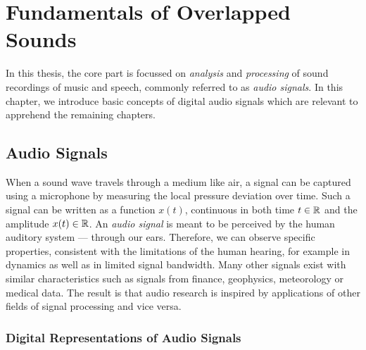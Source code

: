 \hypertarget{Fundamentals of Overlapped Sounds}{%
\chapter{Fundamentals of Overlapped Sounds}\label{cha:fundamentals}}

In this thesis, the core part is focussed on \emph{analysis} and \emph{processing} of sound recordings of music and speech, commonly referred to as \emph{audio signals}.
In this chapter, we introduce basic concepts of digital audio signals which are relevant to apprehend the remaining chapters.

\hypertarget{Audio Signals}{%
\section{Audio Signals}\label{sec:specifics-of-audio-signals}}

When a sound wave travels through a medium like air, a signal can be captured using a microphone by measuring the local pressure deviation over time.
Such a signal can be written as a function \(x(t)\), continuous in both time \(t \in {\mathbb{R}}\) and the amplitude \(x(t) \in {\mathbb{R}}\).
An \emph{audio signal} is meant to be perceived by the human auditory system --- through our ears.
Therefore, we can observe specific properties, consistent with the limitations of the human hearing, for example in dynamics as well as in limited signal bandwidth.
Many other signals exist with similar characteristics such as signals from finance, geophysics, meteorology or medical data.
The result is that audio research is inspired by applications of other fields of signal processing and vice versa.

\hypertarget{digital-representations-of-audio-signals}{%
\subsection{Digital Representations of Audio
Signals}\label{digital-representations-of-audio-signals}}

